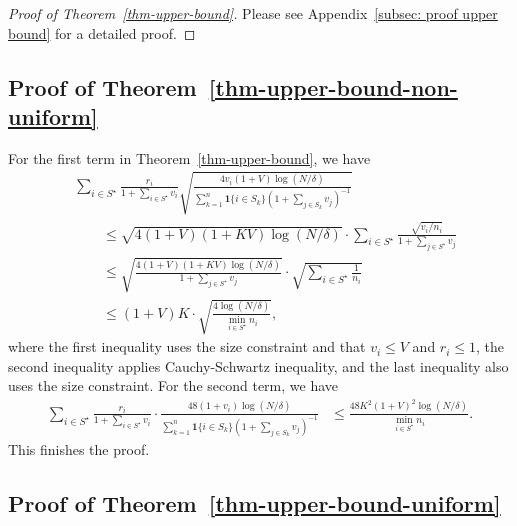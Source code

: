 \documentclass[10pt, letterpaper]{article}
\begin{document}
\begin{proof}[Proof of Theorem~\ref{thm-upper-bound}]
    Please see Appendix~\ref{subsec: proof upper bound} for a detailed proof.
\end{proof}


\subsection{Proof of Theorem~\ref{thm-upper-bound-non-uniform}}\label{subsec: proof upper bound non uniform}

For the first term in Theorem~\ref{thm-upper-bound}, we have \begin{align*}
&\sum_{i\in S^\star} \frac{r_i}{1+\sum_{i\in S^\star} v_i} \sqrt{\frac{4v_i(1+V)\log (N/\delta) }{\sum_{k = 1}^n \bm{1}\{i\in S_k\}(1+\sum_{j\in S_k}v_j)^{-1}}} \\
& \qquad\leq \sqrt{4(1+V)(1+KV)\log(N/\delta)} \cdot \sum_{i\in S^\star} \frac{\sqrt{v_i/n_i}}{1+\sum_{j\in S^\star} v_j}\\
&\qquad \leq \sqrt{\frac{4(1+V)(1+KV)\log(N/\delta)}{1+\sum_{j\in S^\star} v_j}}  \cdot\sqrt{\sum_{i\in S^\star}\frac{1}{n_i}}\\
&\qquad \leq (1+V)K\cdot\sqrt{\frac{4\log (N/\delta)}{\min_{i\in S^\star}n_i}},
\end{align*}
where the first inequality uses the size constraint and that $v_i\leq V$ and $r_i\leq 1$, the second inequality applies Cauchy-Schwartz inequality, and the last inequality also uses the size constraint.
For the second term, we have \begin{align*}
\sum_{i\in S^\star} \frac{r_i}{1+\sum_{i\in S^\star} v_i}\cdot  \frac{48(1+v_i)\log (N/\delta) }{\sum_{k = 1}^n \bm{1}\{i\in S_k\}(1+\sum_{j\in S_k}v_j)^{-1}} & \leq  \frac{48K^2(1+V)^2\log(N/\delta)}{\min_{i\in S^\star} n_i}.
\end{align*}
This finishes the proof.
\endproof

\subsection{Proof of Theorem~\ref{thm-upper-bound-uniform}}\label{subsec: proof upper bound uniform}
\end{document}
